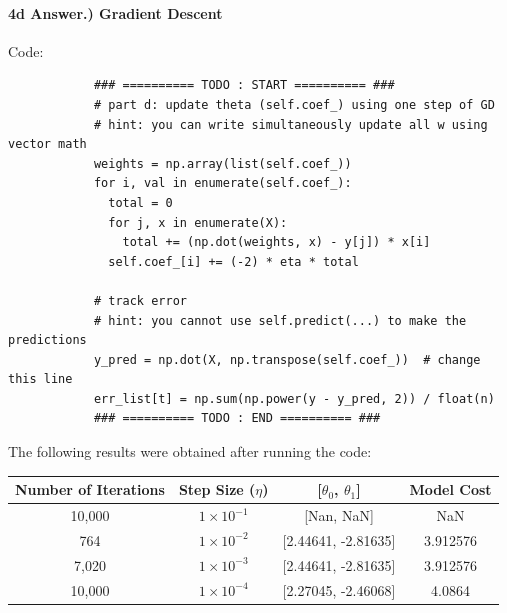 \documentclass[10pt]{article}
\begin{document}
\paragraph{4d Answer.) Gradient Descent}
\hspace{1cm}

Code:\\
\begin{verbatim}
            ### ========== TODO : START ========== ###
            # part d: update theta (self.coef_) using one step of GD
            # hint: you can write simultaneously update all w using vector math
            weights = np.array(list(self.coef_))
            for i, val in enumerate(self.coef_):
              total = 0
              for j, x in enumerate(X):
                total += (np.dot(weights, x) - y[j]) * x[i]
              self.coef_[i] += (-2) * eta * total

            # track error
            # hint: you cannot use self.predict(...) to make the predictions
            y_pred = np.dot(X, np.transpose(self.coef_))  # change this line
            err_list[t] = np.sum(np.power(y - y_pred, 2)) / float(n)
            ### ========== TODO : END ========== ###
\end{verbatim}

The following results were obtained after running the code:

\begin{table}[h!]
\centering
\begin{tabular}{@{}cccc@{}}
\toprule
Number of Iterations & Step Size ($\eta$) & [$\theta_0$, $\theta_1$] & Model Cost \\ \midrule
10,000               & $1 \times 10^{-1}$     & [Nan, NaN]    & NaN   \\
764               & $1 \times 10^{-2}$     & [2.44641, -2.81635]   & 3.912576  \\
7,020                & $1 \times 10^{-3}$     & [2.44641, -2.81635]      & 3.912576  \\
10,000                  & $1 \times 10^{-4}$ & [2.27045, -2.46068]   & 4.0864    \\ \bottomrule
\end{tabular}
\end{table}
\end{document}

